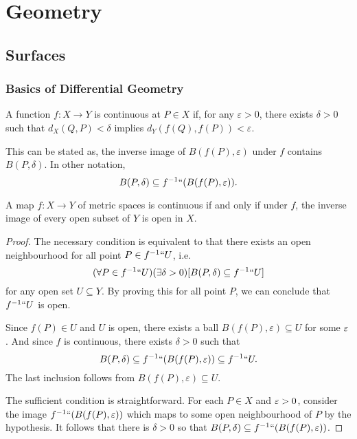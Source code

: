 \documentclass[main.tex]{subfiles}
\begin{document}
	\chapter{Geometry}
		\section{Surfaces}
		\subsection{Basics of Differential Geometry}
		\begin{definition}
			A function $f\colon X \to Y$ is continuous at $P\in X$ if, for any $\varepsilon >0$, there exists $\delta > 0$ such that $d_X(Q, P) < \delta$ implies $d_Y(f(Q), f(P)) < \varepsilon$.
			
			This can be stated as, the inverse image of $B(f(P), \varepsilon)$ under $f$ contains $B(P, \delta)$. In other notation,
			\begin{equation*}
					B(P,\delta) \subseteq f^{-1} ``(B(f(P), \varepsilon)).
			\end{equation*}
		\end{definition}
		\begin{lemma}
			A map $f\colon X \to Y$ of metric spaces is continuous if and only if under $f$, the inverse image  of every open subset of $Y$ is open in $X$.
		\end{lemma}
		\begin{proof}
			The necessary condition is equivalent to that there exists an open neighbourhood for all point $P \in f^{-1} ``U$, i.e.
			\begin{equation*}
			(\forall P \in f^{-1} ``U)(\exists \delta > 0)[B(P, \delta) \subseteq f^{-1} ``U]
			\end{equation*}
			for any open set $U \subseteq Y$. By proving this for all point $P$, we can conclude that $f^{-1} `` U$ is open. 
			
			Since $f(P) \in U$ and $U$ is open, there exists a ball $B(f(P), \varepsilon) \subseteq U$ for some $\varepsilon$. And since $f$ is continuous, there exists $\delta > 0$ such that
			\begin{equation*}
				B(P, \delta) \subseteq f^{-1} ``(B(f(P), \varepsilon)) \subseteq f^{-1}``U.
			\end{equation*} 
			The last inclusion follows from $B(f(P), \varepsilon) \subseteq U$.
			
			The sufficient condition is straightforward. For each $P \in X$ and $\varepsilon > 0$, consider the image $f^{-1} ``(B(f(P), \varepsilon))$ which maps to some open neighbourhood of $P$ by the hypothesis. It follows that there is $\delta >0$ so that $B(P,\delta) \subseteq f^{-1} ``(B(f(P), \varepsilon))$.
		\end{proof}
\end{document}
